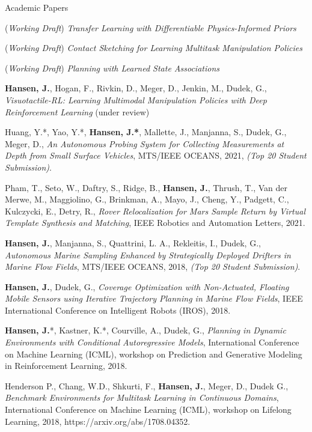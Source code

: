 \documentclass{resume} %
\begin{document}
	\vspace{-.5cm}
\begin{rSection}{Academic Papers}

(\emph{Working Draft}) \textit{Transfer Learning with Differentiable Physics-Informed Priors}

(\emph{Working Draft}) \textit{Contact Sketching for Learning Multitask Manipulation Policies}

(\emph{Working Draft}) \textit{Planning with Learned State Associations }

\textbf{Hansen, J.}, Hogan, F., Rivkin, D., Meger, D., Jenkin, M., Dudek, G., \textit{Visuotactile-RL: Learning Multimodal Manipulation Policies with Deep Reinforcement Learning} (under review)


Huang, Y.*, Yao, Y.*, \textbf{Hansen, J.*}, Mallette, J., Manjanna, S., Dudek, G.,  Meger, D., \textit{An Autonomous Probing System for Collecting Measurements at Depth from Small Surface Vehicles}, MTS/IEEE OCEANS, 2021, \emph{{(Top 20 Student Submission)}}.

Pham, T., Seto, W., Daftry, S., Ridge, B., \textbf{Hansen, J.}, Thrush, T., Van der Merwe, M., Maggiolino, G., Brinkman, A., Mayo, J., Cheng, Y., Padgett, C., Kulczycki, E., Detry, R., \textit{Rover Relocalization for Mars Sample Return by Virtual Template Synthesis and Matching},  IEEE Robotics and Automation Letters, 2021.

\textbf{Hansen, J.}, Manjanna, S.,  Quattrini, L. A., Rekleitis, I., Dudek, G., \textit{Autonomous Marine Sampling Enhanced by Strategically Deployed Drifters in Marine Flow Fields}, MTS/IEEE OCEANS, 2018, \emph{{(Top 20 Student Submission)}}.

\textbf{Hansen, J.}, Dudek, G., \textit{Coverage Optimization with Non-Actuated, Floating Mobile Sensors using Iterative Trajectory Planning in Marine Flow Fields}, IEEE International Conference on Intelligent Robots (IROS), 2018.

\textbf{Hansen, J.}*, Kastner, K.*, Courville, A., Dudek, G.,  \textit{Planning in Dynamic Environments with Conditional Autoregressive Models}, International Conference on Machine Learning (ICML), workshop on Prediction and Generative Modeling in Reinforcement Learning, 2018.

Henderson P., Chang, W.D., Shkurti, F., \textbf{Hansen, J.}, Meger, D., Dudek G., 
\textit{Benchmark Environments for Multitask Learning in Continuous Domains}, International Conference on Machine Learning (ICML), workshop on Lifelong Learning, 2018, https://arxiv.org/abs/1708.04352. 


\end{rSection}
\end{document}
